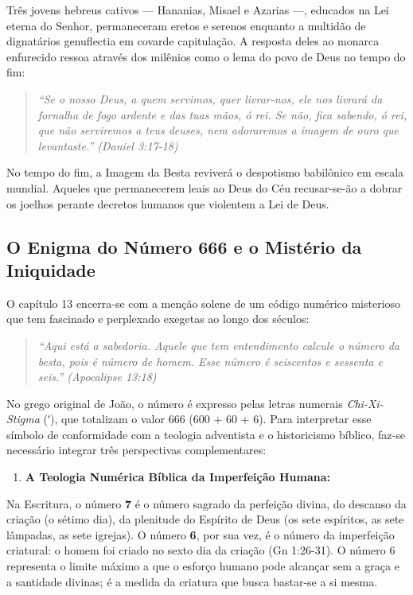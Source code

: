 \documentclass[11pt,a4paper,openany]{book}
\begin{document}
Três jovens hebreus cativos — Hananias, Misael e Azarias —, educados na Lei eterna do Senhor, permaneceram eretos e serenos enquanto a multidão de dignatários genuflectia em covarde capitulação. A resposta deles ao monarca enfurecido ressoa através dos milênios como o lema do povo de Deus no tempo do fim:


\begin{quote}
\itshape \textit{``Se o nosso Deus, a quem servimos, quer livrar-nos, ele nos livrará da fornalha de fogo ardente e das tuas mãos, ó rei. Se não, fica sabendo, ó rei, que não serviremos a teus deuses, nem adoraremos a imagem de ouro que levantaste.''} (Daniel 3:17-18)
\end{quote}


No tempo do fim, a Imagem da Besta reviverá o despotismo babilônico em escala mundial. Aqueles que permanecerem leais ao Deus do Céu recusar-se-ão a dobrar os joelhos perante decretos humanos que violentem a Lei de Deus.



\subsection{O Enigma do Número 666 e o Mistério da Iniquidade}


O capítulo 13 encerra-se com a menção solene de um código numérico misterioso que tem fascinado e perplexado exegetas ao longo dos séculos:


\begin{quote}
\itshape \textit{``Aqui está a sabedoria. Aquele que tem entendimento calcule o número da besta, pois é número de homem. Esse número é seiscentos e sessenta e seis.''} (Apocalipse 13:18)
\end{quote}


No grego original de João, o número é expresso pelas letras numerais \textit{Chi-Xi-Stigma} (ʹ), que totalizam o valor 666 (600 + 60 + 6). Para interpretar esse símbolo de conformidade com a teologia adventista e o historicismo bíblico, faz-se necessário integrar três perspectivas complementares:

\begin{enumerate}
  \item \textbf{A Teologia Numérica Bíblica da Imperfeição Humana:}
\end{enumerate}

Na Escritura, o número \textbf{7} é o número sagrado da perfeição divina, do descanso da criação (o sétimo dia), da plenitude do Espírito de Deus (os sete espíritos, as sete lâmpadas, as sete igrejas). O número \textbf{6}, por sua vez, é o número da imperfeição criatural: o homem foi criado no sexto dia da criação (Gn 1:26-31). O número 6 representa o limite máximo a que o esforço humano pode alcançar sem a graça e a santidade divinas; é a medida da criatura que busca bastar-se a si mesma.
\end{document}
